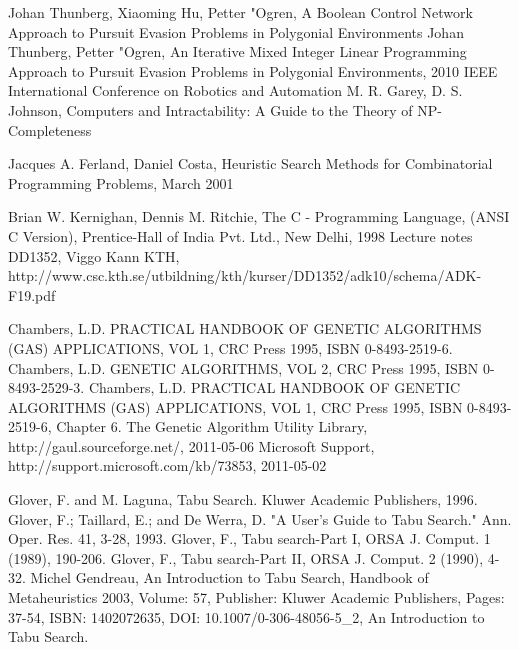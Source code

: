 \begin{thebibliography}{99}
  Johan Thunberg, Xiaoming Hu, Petter "Ogren, A Boolean Control Network Approach to Pursuit Evasion Problems in Polygonial Environments
 Johan Thunberg, Petter "Ogren, An Iterative Mixed Integer Linear Programming Approach to Pursuit Evasion Problems in Polygonial Environments, 2010 IEEE International Conference on Robotics and Automation
 M. R. Garey, D. S. Johnson, Computers and Intractability: A Guide to the Theory of NP-Completeness

Jacques A. Ferland, Daniel Costa, Heuristic Search Methods for Combinatorial Programming Problems, March 2001

 Brian W. Kernighan, Dennis M. Ritchie, The C - Programming Language, (ANSI C Version), Prentice-Hall of India Pvt. Ltd., New Delhi, 1998
Lecture notes DD1352, Viggo Kann KTH,  http://www.csc.kth.se/utbildning/kth/kurser/DD1352/adk10/schema/ADK-F19.pdf

 Chambers, L.D. PRACTICAL HANDBOOK OF GENETIC ALGORITHMS (GAS) APPLICATIONS, VOL 1, CRC Press 1995, ISBN 0-8493-2519-6.
 Chambers, L.D. GENETIC ALGORITHMS, VOL 2, CRC Press 1995, ISBN 0-8493-2529-3.
 Chambers, L.D. PRACTICAL HANDBOOK OF GENETIC ALGORITHMS (GAS) APPLICATIONS, VOL 1, CRC Press 1995, ISBN 0-8493-2519-6, Chapter 6.
 The Genetic Algorithm Utility Library, http://gaul.sourceforge.net/, 2011-05-06
 Microsoft Support, http://support.microsoft.com/kb/73853, 2011-05-02


 Glover, F. and M. Laguna, Tabu Search. Kluwer Academic Publishers, 1996.
 Glover, F.; Taillard, E.; and De Werra, D. "A User's Guide to Tabu Search." Ann. Oper. Res. 41, 3-28, 1993.
 Glover, F., Tabu search-Part I, ORSA J. Comput. 1 (1989), 190-206.
 Glover, F., Tabu search-Part II, ORSA J. Comput. 2 (1990), 4-32.
 Michel Gendreau, An Introduction to Tabu Search, Handbook of Metaheuristics 2003, Volume: 57, Publisher: Kluwer Academic Publishers, Pages: 37-54, ISBN: 1402072635, DOI: 10.1007/0-306-48056-5\_2, An Introduction to Tabu Search.



\end{thebibliography}
